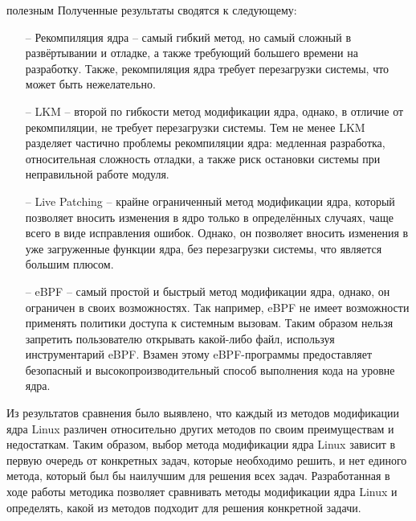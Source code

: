 полезным
Полученные результаты сводятся к следующему:
\begin{itemize}
    \item[--] Рекомпиляция ядра -- самый гибкий метод, но самый сложный в развёртывании и отладке, а также требующий большего времени на разработку.
    Также, рекомпиляция ядра требует перезагрузки системы, что может быть нежелательно.
    \item[--] LKM -- второй по гибкости метод модификации ядра, однако, в отличие от рекомпиляции, не требует перезагрузки системы.
    Тем не менее LKM разделяет частично проблемы рекомпиляции ядра: медленная разработка, относительная сложность отладки, а также риск остановки системы при неправильной работе модуля.
    \item[--] Live Patching -- крайне ограниченный метод модификации ядра, который позволяет вносить изменения в ядро только в определённых случаях, чаще всего в виде исправления ошибок.
    Однако, он позволяет вносить изменения в уже загруженные функции ядра, без перезагрузки системы, что является большим плюсом.
    \item[--] eBPF -- самый простой и быстрый метод модификации ядра, однако, он ограничен в своих возможностях.
    Так например, eBPF не имеет возможности применять политики доступа к системным вызовам.
    Таким образом нельзя запретить пользователю открывать какой-либо файл, используя инструментарий eBPF\@.
    Взамен этому eBPF-программы предоставляет безопасный и высокопроизводительный способ выполнения кода на уровне ядра.
\end{itemize}

\indent Из результатов сравнения было выявлено, что каждый из методов модификации ядра Linux различен относительно других методов по своим преимуществам и недостаткам.
Таким образом, выбор метода модификации ядра Linux зависит в первую очередь от конкретных задач, которые необходимо решить, и нет единого метода, который был бы наилучшим для решения всех задач.
Разработанная в ходе работы методика позволяет сравнивать методы модификации ядра Linux и определять, какой из методов подходит для решения конкретной задачи.
